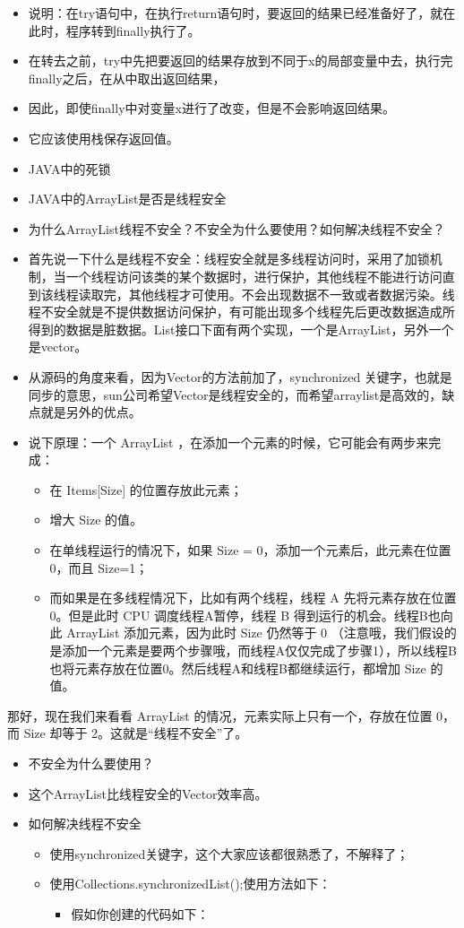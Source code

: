 \documentclass[9pt, b5paper]{article}
\begin{document}
\begin{itemize}
\item 说明：在try语句中，在执行return语句时，要返回的结果已经准备好了，就在此时，程序转到finally执行了。
\item 在转去之前，try中先把要返回的结果存放到不同于x的局部变量中去，执行完finally之后，在从中取出返回结果，
\item 因此，即使finally中对变量x进行了改变，但是不会影响返回结果。
\item 它应该使用栈保存返回值。
\item JAVA中的死锁
\item JAVA中的ArrayList是否是线程安全
\item 为什么ArrayList线程不安全？不安全为什么要使用？如何解决线程不安全？
\item 首先说一下什么是线程不安全：线程安全就是多线程访问时，采用了加锁机制，当一个线程访问该类的某个数据时，进行保护，其他线程不能进行访问直到该线程读取完，其他线程才可使用。不会出现数据不一致或者数据污染。线程不安全就是不提供数据访问保护，有可能出现多个线程先后更改数据造成所得到的数据是脏数据。List接口下面有两个实现，一个是ArrayList，另外一个是vector。
\item 从源码的角度来看，因为Vector的方法前加了，synchronized 关键字，也就是同步的意思，sun公司希望Vector是线程安全的，而希望arraylist是高效的，缺点就是另外的优点。
\item 说下原理：一个 ArrayList ，在添加一个元素的时候，它可能会有两步来完成：
\begin{itemize}
\item 在 Items[Size] 的位置存放此元素；
\item 增大 Size 的值。
\item 在单线程运行的情况下，如果 Size = 0，添加一个元素后，此元素在位置 0，而且 Size=1；
\item 而如果是在多线程情况下，比如有两个线程，线程 A 先将元素存放在位置 0。但是此时 CPU 调度线程A暂停，线程 B 得到运行的机会。线程B也向此 ArrayList 添加元素，因为此时 Size 仍然等于 0 （注意哦，我们假设的是添加一个元素是要两个步骤哦，而线程A仅仅完成了步骤1），所以线程B也将元素存放在位置0。然后线程A和线程B都继续运行，都增加 Size 的值。
\end{itemize}
\end{itemize}
那好，现在我们来看看 ArrayList 的情况，元素实际上只有一个，存放在位置 0，而 Size 却等于 2。这就是“线程不安全”了。
\begin{itemize}
\item 不安全为什么要使用？
\item 这个ArrayList比线程安全的Vector效率高。
\item 如何解决线程不安全
\begin{itemize}
\item 使用synchronized关键字，这个大家应该都很熟悉了，不解释了；
\item 使用Collections.synchronizedList();使用方法如下：
\begin{itemize}
\item 假如你创建的代码如下：
\end{itemize}
\end{itemize}
\end{itemize}
\end{document}
